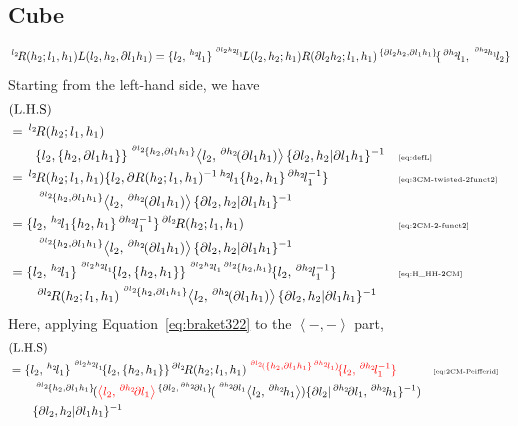 \documentclass[11pt, reqno]{amsart} %
\newcommand{\act}[1]{\,\sp{#1}\!}
\newcommand{\red}[1]{\textcolor{red}{#1}}
\theoremstyle{definition}
\theoremstyle{remark}
\numberwithin{equation}{section}
\begin{document}
\subsection{Cube}
\[
  \act{l_2}R(h_2;l_1,h_1)L(l_2,h_2,\partial l_1h_1) = \{l_2,\act{h_2}l_1\}\act{\act{\partial l_2h_2}l_1}L(l_2,h_2;h_1)R(\partial l_2h_2;l_1,h_1)\act{\{\partial l_2h_2,\partial l_1h_1\}}\{\act{\partial h_2}l_1,\act{\act{\partial h_2}h_1}l_2\}
\]
Starting from the left-hand side, we have
\begin{align*}
  &(\text{L.H.S}) \\
  &= 
  \act{l_2}R(h_2;l_1,h_1) \\
  &\qquad \{l_2,\{h_2,\partial l_1h_1\}\}\act{\act{\partial l_2}\{h_2,\partial l_1h_1\}}\left<l_2,\act{\partial h_2}(\partial l_1h_1)\right>\{\partial l_2,h_2|\partial l_1h_1\}^{-1} & &\text{\tiny \eqref{eq:defL}} \\
  &= \act{l_2}R(h_2;l_1,h_1)\{l_2,\partial R(h_2;l_1,h_1)^{-1}\act{h_2}l_1\{h_2,h_1\}\act{\partial h_2}l_1^{-1}\} & &\text{\tiny \eqref{eq:3CM-twisted-2funct2}} \\
  &\qquad \act{\act{\partial l_2}\{h_2,\partial l_1h_1\}}\left<l_2,\act{\partial h_2}(\partial l_1h_1)\right>\{\partial l_2,h_2|\partial l_1h_1\}^{-1} \\
  &= \{l_2,\act{h_2}l_1\{h_2,h_1\}\act{\partial h_2}l_1^{-1}\}\act{\partial l_2}R(h_2;l_1,h_1) & &\text{\tiny \eqref{eq:2CM-2-funct2}} \\
  &\qquad \act{\act{\partial l_2}\{h_2,\partial l_1h_1\}}\left<l_2,\act{\partial h_2}(\partial l_1h_1)\right>\{\partial l_2,h_2|\partial l_1h_1\}^{-1} \\
  &= \{l_2,\act{h_2}l_1\}\act{\act{\partial l_2h_2}l_1}\{l_2,\{h_2,h_1\}\}\act{\act{\partial l_2h_2}l_1\act{\partial l_2}\{h_2,h_1\}}\{l_2,\act{\partial h_2}l_1^{-1}\} & &\text{\tiny \eqref{eq:H_HH-2CM}} \\
  &\qquad \act{\partial l_2}R(h_2;l_1,h_1)\act{\act{\partial l_2}\{h_2,\partial l_1h_1\}}\left<l_2,\act{\partial h_2}(\partial l_1h_1)\right>\{\partial l_2,h_2|\partial l_1h_1\}^{-1}
\end{align*}
Here, applying Equation~\eqref{eq:braket322} to the $\left<-,-\right>$ part,
\begin{align*}
  &(\text{L.H.S}) \\
  &= \{l_2,\act{h_2}l_1\}\act{\act{\partial l_2h_2}l_1}\{l_2,\{h_2,h_1\}\}\act{\partial l_2}R(h_2;l_1,h_1)\red{\act{\act{\partial l_2}(\{h_2,\partial l_1h_1\}\act{\partial h_2}l_1)}\{l_2,\act{\partial h_2}l_1^{-1}\}} & &\text{\tiny \eqref{eq:2CM-Peifferid}} \\
  &\qquad \act{\act{\partial l_2}\{h_2,\partial l_1h_1\}}(\red{\left<l_2,\act{\partial h_2}\partial l_1\right>}\act{\{\partial l_2,\act{\partial h_2}\partial l_1\}}(\act{\act{\partial h_2}\partial l_1}\left<l_2,\act{\partial h_2}h_1\right>)\{\partial l_2|\act{\partial h_2}\partial l_1,\act{\partial h_2}h_1\}^{-1}) \\
  &\qquad \{\partial l_2,h_2|\partial l_1h_1\}^{-1}
\end{align*}
\end{document}
